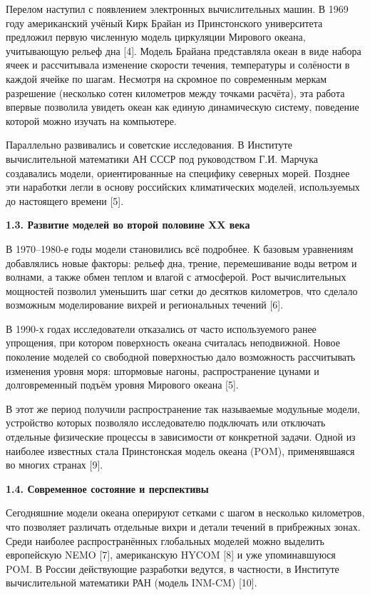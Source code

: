 \documentclass[a4paper,14pt]{extarticle}
\begin{document}
\noindent Перелом наступил с появлением электронных вычислительных машин. В 1969 году американский учёный Кирк Брайан из Принстонского университета предложил первую численную модель циркуляции Мирового океана, учитывающую рельеф дна [4]. Модель Брайана представляла океан в виде набора ячеек и рассчитывала изменение скорости течения, температуры и солёности в каждой ячейке по шагам. Несмотря на скромное по современным меркам разрешение (несколько сотен километров между точками расчёта), эта работа впервые позволила увидеть океан как единую динамическую систему, поведение которой можно изучать на компьютере.

\noindent Параллельно развивались и советские исследования. В Институте вычислительной математики АН СССР под руководством Г.И. Марчука создавались модели, ориентированные на специфику северных морей. Позднее эти наработки легли в основу российских климатических моделей, используемых до настоящего времени [5].

\vspace{\baselineskip}

\noindent \textbf{1.3. Развитие моделей во второй половине XX века}

\noindent В 1970--1980-е годы модели становились всё подробнее. К базовым уравнениям добавлялись новые факторы: рельеф дна, трение, перемешивание воды ветром и волнами, а также обмен теплом и влагой с атмосферой. Рост вычислительных мощностей позволил уменьшить шаг сетки до десятков километров, что сделало возможным моделирование вихрей и региональных течений [6].

\noindent В 1990-х годах исследователи отказались от часто используемого ранее упрощения, при котором поверхность океана считалась неподвижной. Новое поколение моделей со свободной поверхностью дало возможность рассчитывать изменения уровня моря: штормовые нагоны, распространение цунами и долговременный подъём уровня Мирового океана [5].

\noindent В этот же период получили распространение так называемые модульные модели, устройство которых позволяло исследователю подключать или отключать отдельные физические процессы в зависимости от конкретной задачи. Одной из наиболее известных стала Принстонская модель океана (POM), применявшаяся во многих странах [9].

\vspace{\baselineskip}

\noindent \textbf{1.4. Современное состояние и перспективы}

\noindent Сегодняшние модели океана оперируют сетками с шагом в несколько километров, что позволяет различать отдельные вихри и детали течений в прибрежных зонах. Среди наиболее распространённых глобальных моделей можно выделить европейскую NEMO [7], американскую HYCOM [8] и уже упоминавшуюся POM. В России действующие разработки ведутся, в частности, в Институте вычислительной математики РАН (модель INM-CM) [10].
\end{document}
